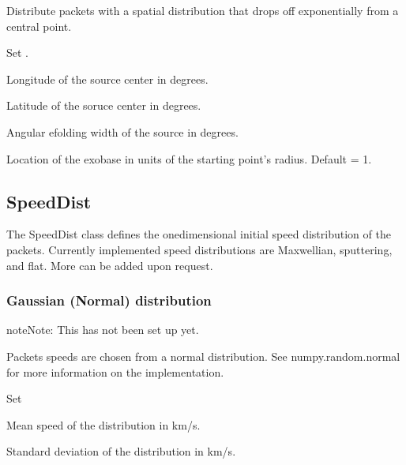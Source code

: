 \documentclass[letterpaper,10pt,english]{sphinxmanual}
\begin{document}
\sphinxAtStartPar
Distribute packets with a spatial distribution that drops off exponentially
from a central point.
\begin{description}
\sphinxAtStartPar
Set .

\sphinxAtStartPar
Longitude of the source center in degrees.

\sphinxAtStartPar
Latitude of the soruce center in degrees.

\sphinxAtStartPar
Angular e\sphinxhyphen{}folding width of the source in degrees.

\sphinxAtStartPar
Location of the exobase in units of the starting point’s radius.
Default = 1.

\end{description}


\subsection{SpeedDist}
\label{\detokenize{nexoclom2/inputfiles:speeddist}}\label{\detokenize{nexoclom2/inputfiles:id4}}
\sphinxAtStartPar
The SpeedDist class defines the one\sphinxhyphen{}dimensional initial speed distribution
of the packets. Currently implemented speed distributions are
Maxwellian, sputtering, and flat. More can be added upon request.


\subsubsection{Gaussian (Normal) distribution}
\label{\detokenize{nexoclom2/inputfiles:gaussian-normal-distribution}}\label{\detokenize{nexoclom2/inputfiles:gaussianspeeddist}}
\begin{sphinxadmonition}{note}{Note:}
\sphinxAtStartPar
This has not been set up yet.
\end{sphinxadmonition}

\sphinxAtStartPar
Packets speeds are chosen from a normal distribution. See
{\color{red}\bfseries{}\textasciigrave{}}numpy.random.normal
for more information on the implementation.
\begin{description}
\sphinxAtStartPar
Set 

\sphinxAtStartPar
Mean speed of the distribution in km/s.

\sphinxAtStartPar
Standard deviation of the distribution in km/s.

\end{description}
\end{document}
